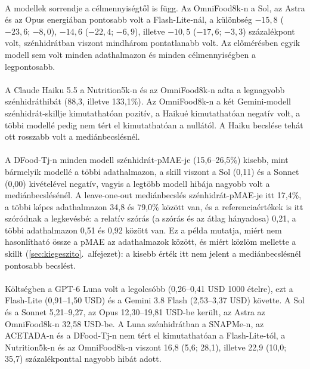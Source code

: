 \paragraph{}A modellek sorrendje a célmennyiségtől is függ. Az OmniFood8k-n a Sol, az Astra 
és az Opus energiában pontosabb volt a Flash-Lite-nál, a különbség $-15{,}8$ ($-23{,}6$; $-8{,}0$), 
$-14{,}6$ ($-22{,}4$; $-6{,}9$), illetve $-10{,}5$ ($-17{,}6$; $-3{,}3$) százalékpont volt, 
szénhidrátban viszont mindhárom pontatlanabb volt. Az előmérésben egyik modell sem 
volt minden adathalmazon és minden célmennyiségben a legpontosabb.

\paragraph{}A Claude Haiku 5.5 a Nutrition5k-n és az OmniFood8k-n adta a legnagyobb 
szénhidráthibát (88,3, illetve 133,1\%). Az OmniFood8k-n a két Gemini-modell szénhidrát-skillje kimutathatóan pozitív, a Haikué kimutathatóan negatív volt, 
a többi modellé pedig nem tért el kimutathatóan a nullától. A Haiku becslése tehát ott rosszabb volt a mediánbecslésnél.

\paragraph{}A DFood-Tj-n minden modell szénhidrát-pMAE-je (15,6--26,5\%) kisebb, 
mint bármelyik modellé a többi adathalmazon, a skill viszont a Sol (0,11) 
és a Sonnet (0,00) kivételével negatív, vagyis a legtöbb modell hibája nagyobb volt a 
mediánbecslésénél. A leave-one-out mediánbecslés szénhidrát-pMAE-je itt 17,4\%, a többi 
képes adathalmazon 34,8 és 79,0\% között van, és a referenciaértékek is itt szóródnak a 
legkevésbé: a relatív szórás (a szórás és az átlag hányadosa) 0,21, a többi adathalmazon 
0,51 és 0,92 között van. Ez a példa mutatja, miért nem hasonlítható össze a pMAE az 
adathalmazok között, és miért közlöm mellette a skillt 
(\ref{sec:kiegeszito}.~alfejezet): a kisebb érték itt nem jelent a mediánbecslésnél 
pontosabb becslést.

\paragraph{}Költségben a GPT-6 Luna volt a legolcsóbb (0,26--0,41 USD 1000 ételre), ezt a 
Flash-Lite (0,91--1,50 USD) és a Gemini 3.8 Flash (2,53--3,37 USD) követte. A Sol és a Sonnet 
5,21--9,27, az Opus 12,30--19,81 USD-be került, az Astra az OmniFood8k-n 32,58 USD-be. A Luna 
szénhidrátban a SNAPMe-n, az ACETADA-n és a DFood-Tj-n nem tért el kimutathatóan a 
Flash-Lite-tól, a Nutrition5k-n és az OmniFood8k-n viszont 16,8 (5,6; 28,1), illetve 
22,9 (10,0; 35,7) százalékponttal nagyobb hibát adott.

